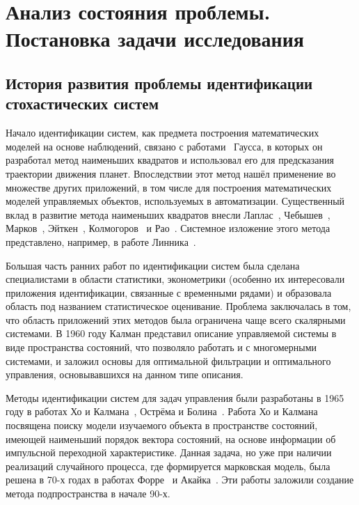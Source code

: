 \chapter[Анализ состояния проблемы. Постановка задачи исследования]{%
  Анализ состояния проблемы. \hspace{2cm}
  Постановка задачи исследования
}

\section[История развития проблемы идентификации стохастических систем]{%
  \color{red} История развития проблемы идентификации \\
  стохастических систем
}

Начало идентификации систем, как предмета построения математических моделей на основе наблюдений,
связано с работами~\cite{gauss_1809, gauss_1810, gauss_1821} Гаусса,
в которых он разработал метод наименьших квадратов и использовал его для предсказания
траектории движения планет.
Впоследствии этот метод нашёл применение во множестве других приложений,
в том числе для построения математических моделей управляемых объектов,
используемых в автоматизации.
Существенный вклад в развитие метода наименьших квадратов внесли
Лаплас~\cite{laplace_1812}, Чебышев~\cite{chebyshev_1859}, Марков~\cite{markov_1898},
Эйткен~\cite{aitken_1935}, Колмогоров~\cite{kolmogorov_1946} и Рао~\cite{rao_1946}.
Системное изложение этого метода представлено, например, в работе Линника~\cite{linnik62}.

Большая часть ранних работ по идентификации систем была сделана специалистами в области статистики,
эконометрики (особенно их интересовали приложения идентификации, связанные с временными рядами) и
образовала область под названием статистическое оценивание.
{\color{red} Проблема заключалась в том, что область приложений этих методов была ограничена чаще всего
скалярными системами.}
В 1960 году Калман представил описание управляемой системы в
виде пространства состояний, что позволяло работать и с многомерными системами,
и заложил основы для оптимальной фильтрации и оптимального управления,
основывавшихся на данном типе описания.

Методы идентификации систем для задач управления были разработаны в 1965 году в работах
Хо и Калмана~\cite{ho_1965}, Острёма и Болина~\cite{astrom_1965}.
Работа Хо и Калмана посвящена поиску модели изучаемого объекта в пространстве состояний,
имеющей наименьший порядок вектора состояний, на основе информации об импульсной переходной характеристике.
Данная задача, но уже при наличии реализаций случайного процесса, где формируется марковская модель,
была решена в 70-х годах в работах Форре~\cite{faurre_1973} и Акайка~\cite{akaike_1974}.
Эти работы заложили создание метода подпространства в начале 90-х.

